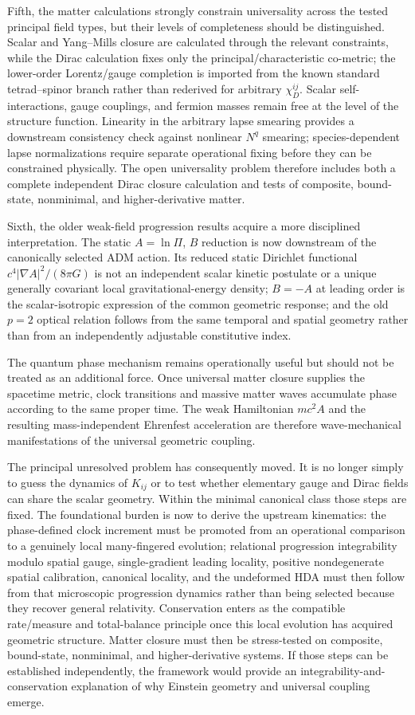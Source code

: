 \documentclass[11pt]{article}
\begin{document}
Fifth, the matter calculations strongly constrain universality across the tested principal field types, but their levels of completeness should be distinguished. Scalar and Yang--Mills closure are calculated through the relevant constraints, while the Dirac calculation fixes only the principal/characteristic co-metric; the lower-order Lorentz/gauge completion is imported from the known standard tetrad--spinor branch rather than rederived for arbitrary $\chi_D^{ij}$. Scalar self-interactions, gauge couplings, and fermion masses remain free at the level of the structure function. Linearity in the arbitrary lapse smearing provides a downstream consistency check against nonlinear $N^q$ smearing; species-dependent lapse normalizations require separate operational fixing before they can be constrained physically. The open universality problem therefore includes both a complete independent Dirac closure calculation and tests of composite, bound-state, nonminimal, and higher-derivative matter.

Sixth, the older weak-field progression results acquire a more disciplined interpretation. The static $A=\ln\Pi$, $B$ reduction is now downstream of the canonically selected ADM action. Its reduced static Dirichlet functional $c^4|\nabla A|^2/(8\pi G)$ is not an independent scalar kinetic postulate or a unique generally covariant local gravitational-energy density; $B=-A$ at leading order is the scalar-isotropic expression of the common geometric response; and the old $p=2$ optical relation follows from the same temporal and spatial geometry rather than from an independently adjustable constitutive index.

The quantum phase mechanism remains operationally useful but should not be treated as an additional force. Once universal matter closure supplies the spacetime metric, clock transitions and massive matter waves accumulate phase according to the same proper time. The weak Hamiltonian $mc^2A$ and the resulting mass-independent Ehrenfest acceleration are therefore wave-mechanical manifestations of the universal geometric coupling.

The principal unresolved problem has consequently moved. It is no longer simply to guess the dynamics of $K_{ij}$ or to test whether elementary gauge and Dirac fields can share the scalar geometry. Within the minimal canonical class those steps are fixed. The foundational burden is now to derive the upstream kinematics: the phase-defined clock increment must be promoted from an operational comparison to a genuinely local many-fingered evolution; relational progression integrability modulo spatial gauge, single-gradient leading locality, positive nondegenerate spatial calibration, canonical locality, and the undeformed HDA must then follow from that microscopic progression dynamics rather than being selected because they recover general relativity. Conservation enters as the compatible rate/measure and total-balance principle once this local evolution has acquired geometric structure. Matter closure must then be stress-tested on composite, bound-state, nonminimal, and higher-derivative systems. If those steps can be established independently, the framework would provide an integrability-and-conservation explanation of why Einstein geometry and universal coupling emerge.
\end{document}
